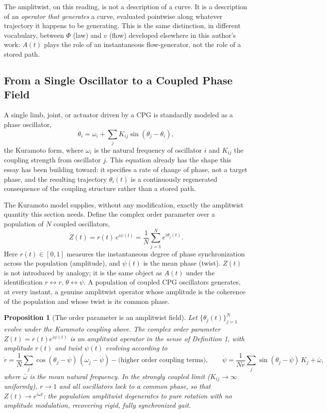 \documentclass[12pt]{article}
\newtheorem{proposition}{Proposition}
\begin{document}
The amplitwist, on this reading, is not a description of a curve. It is a description of an \emph{operator that generates} a curve, evaluated pointwise along whatever trajectory it happens to be generating. This is the same distinction, in different vocabulary, between $\Phi$ (law) and $v$ (flow) developed elsewhere in this author's work: $A(t)$ plays the role of an instantaneous flow-generator, not the role of a stored path.

\subsection{From a Single Oscillator to a Coupled Phase Field}

A single limb, joint, or actuator driven by a CPG is standardly modeled as a phase oscillator,
\[
\dot\theta_i = \omega_i + \sum_{j} K_{ij} \sin(\theta_j - \theta_i),
\]
the Kuramoto form, where $\omega_i$ is the natural frequency of oscillator $i$ and $K_{ij}$ the coupling strength from oscillator $j$. This equation already has the shape this essay has been building toward: it specifies a rate of change of phase, not a target phase, and the resulting trajectory $\theta_i(t)$ is a continuously regenerated consequence of the coupling structure rather than a stored path.

The Kuramoto model supplies, without any modification, exactly the amplitwist quantity this section needs. Define the complex order parameter over a population of $N$ coupled oscillators,
\[
Z(t) = r(t)\, e^{i\psi(t)} = \frac{1}{N} \sum_{j=1}^{N} e^{i\theta_j(t)}.
\]
Here $r(t) \in [0,1]$ measures the instantaneous degree of phase synchronization across the population (amplitude), and $\psi(t)$ is the mean phase (twist). $Z(t)$ is not introduced by analogy; it is the same object as $A(t)$ under the identification $r \leftrightarrow r$, $\theta \leftrightarrow \psi$. A population of coupled CPG oscillators generates, at every instant, a genuine amplitwist operator whose amplitude is the coherence of the population and whose twist is its common phase.

\begin{proposition}[The order parameter is an amplitwist field]
Let $\{\theta_j(t)\}_{j=1}^N$ evolve under the Kuramoto coupling above. The complex order parameter $Z(t) = r(t) e^{i\psi(t)}$ is an amplitwist operator in the sense of Definition 1, with amplitude $r(t)$ and twist $\psi(t)$ evolving according to
\[
\dot r = \frac{1}{N}\sum_j \cos(\theta_j - \psi)\,(\omega_j - \dot\psi) - \text{(higher order coupling terms)}, \qquad
\dot\psi = \frac{1}{Nr}\sum_j \sin(\theta_j - \psi)\, K_j + \bar\omega,
\]
where $\bar\omega$ is the mean natural frequency. In the strongly coupled limit ($K_{ij} \to \infty$ uniformly), $r \to 1$ and all oscillators lock to a common phase, so that $Z(t) \to e^{i\bar\omega t}$: the population amplitwist degenerates to pure rotation with no amplitude modulation, recovering rigid, fully synchronized gait.
\end{proposition}
\end{document}
